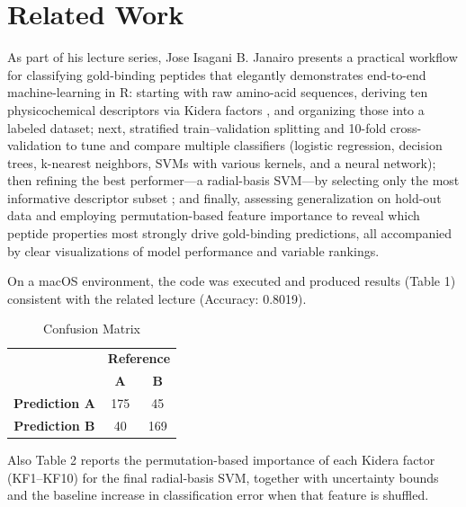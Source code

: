 \documentclass{article}
\begin{document}
\section{Related Work}
As part of his lecture series, Jose Isagani B. Janairo \cite{janairo2022a} presents a practical workflow for classifying gold-binding peptides that elegantly demonstrates end-to-end machine-learning in R: starting with raw amino-acid sequences, deriving ten physicochemical descriptors via Kidera factors \cite{kidera1985}, and organizing those into a labeled dataset; next, stratified train–validation splitting and 10-fold cross-validation to tune and compare multiple classifiers (logistic regression, decision trees, k-nearest neighbors, SVMs with various kernels, and a neural network); then refining the best performer—a radial-basis SVM—by selecting only the most informative descriptor subset \cite{janairo2019}; and finally, assessing generalization on hold-out data and employing permutation-based feature importance to reveal which peptide properties most strongly drive gold-binding predictions, all accompanied by clear visualizations of model performance and variable rankings.

On a macOS environment, the code was executed and produced results (Table 1) consistent with the related lecture (Accuracy: 0.8019).

\begin{table}[h!]
\centering
\begin{tabular}{|c|c|c|}
\cline{2-3}
\multicolumn{1}{c|}{} & \multicolumn{2}{c|}{\textbf{Reference}} \\
\cline{2-3}
\multicolumn{1}{c|}{} & \textbf{A} & \textbf{B} \\
\hline
\textbf{Prediction A} & 175 & 45 \\
\textbf{Prediction B} & 40 & 169 \\
\hline
\end{tabular}
\caption{Confusion Matrix}
\end{table}

Also Table 2 reports the permutation-based importance of each Kidera factor (KF1–KF10) for the final radial‐basis SVM, together with uncertainty bounds and the baseline increase in classification error when that feature is shuffled.
\end{document}
